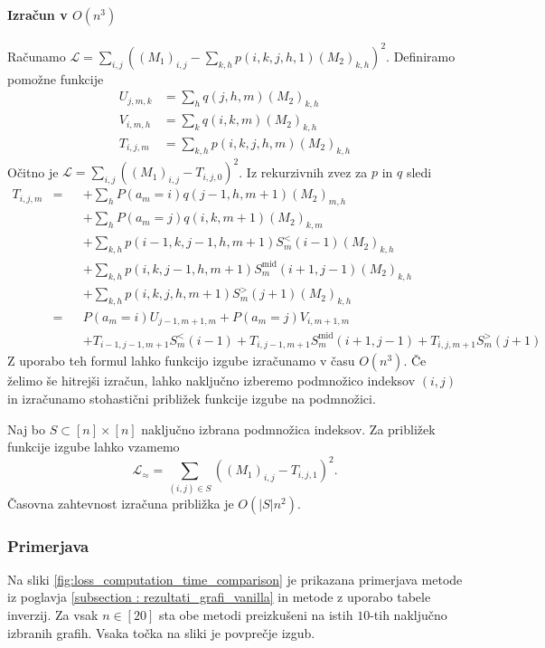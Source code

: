 \documentclass[mat2, tisk]{fmfdelo}
\newcommand{\loss}{\mathcal L}
\begin{document}
\paragraph{Izračun v $O(n^3)$}
%
Računamo
$\loss = \sum_{i,j} \left ((M_1)_{i,j} - \sum_{k,h}p(i, k, j,
h, 1) (M_2)_{k,h} \right )^2$.
Definiramo pomožne funkcije
\begin{align*}
  U_{j, m, k} &= \sum_h q(j, h, m)(M_2)_{k, h} \\
  V_{i, m, h} &= \sum_k q(i, k, m)(M_2)_{k, h} \\
  T_{i, j, m} &= \sum_{k,h} p(i, k, j, h, m) (M_2)_{k,h}
\end{align*}
Očitno je $\loss = \sum_{i,j} \left ((M_1)_{i,j} - T_{i,
j, 0} \right )^2$. Iz rekurzivnih zvez za $p$ in $q$
sledi
\begin{align*}
  T_{i, j, m} &={} &
  &+\sum_h  P(a_m = i) q(j-1, h, m+1) (M_2)_{m,h}  \\
  &   &
  &+\sum_h  P(a_m = j) q(i, k, m+1) (M_2)_{k,m} \\
  &   &
  &+ \sum_{k, h}
  p(i-1, k, j-1, h, m+1) S_m^<(i-1) (M_2)_{k,h} \\
  &   &
  &+\sum_{k, h}
  p(i, k, j-1, h, m+1) S_m^{\text{mid}}(i+1, j-1)(M_2)_{k,h} \\
  &   &
  &+\sum_{k, h}
  p(i, k, j, h, m+1) S_m^>(j+1) (M_2)_{k,h} \\
  &={} &
  &P(a_m=i)  U_{j-1, m+1, m} +
  P(a_m=j) V_{i, m+1, m} \\
  & & &+
  T_{i-1, j-1, m+1}  S_m^<(i-1) +
  T_{i, j-1, m+1}  S_m^{\text{mid}}(i+1, j-1) +
  T_{i, j, m+1}  S_m^>(j+1)
\end{align*}
Z uporabo teh formul lahko funkcijo izgube izračunamo v
času $O(n^3)$. Če želimo še hitrejši izračun, lahko
naključno izberemo podmnožico indeksov $(i,j)$ in
izračunamo stohastični približek funkcije izgube na podmnožici.

Naj bo $S \subset [n] \times [n]$ naključno izbrana
podmnožica indeksov. Za približek funkcije izgube lahko
vzamemo
\begin{equation*}
  \loss_\approx = \sum_{(i, j) \in S}
  \left ((M_1)_{i,j} - T_{i, j, 1} \right )^2.
\end{equation*}
Časovna zahtevnost izračuna približka je
$O(|S| n^2)$.
%
\subsubsection{Primerjava}
\label{paragraph:grafi_preparam_primerjava}
Na sliki \ref{fig:loss_computation_time_comparison} je
prikazana primerjava metode iz poglavja
\ref{subsection : rezultati_grafi_vanilla} in metode z
uporabo tabele inverzij. Za vsak $n \in [20]$ sta
obe metodi preizkušeni na istih $10$-tih naključno izbranih
grafih. Vsaka točka na sliki je povprečje izgub.
\end{document}
